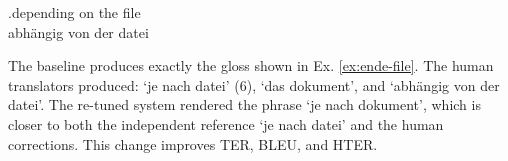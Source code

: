 \vspace{-0.25em}
\exg.depending on the file\label{ex:ende-file}\\
   abh\"{a}ngig von der datei \\%
\vspace{-0.25em}

\noindent The baseline produces exactly the gloss shown in Ex. \ref{ex:ende-file}. The human translators produced: `je nach datei' (6), `das dokument', and `abh\"{a}ngig von der datei'. The re-tuned system rendered the phrase `je nach dokument', which is closer to both the independent reference `je nach datei' and the human corrections. This change improves TER, BLEU, and HTER.
